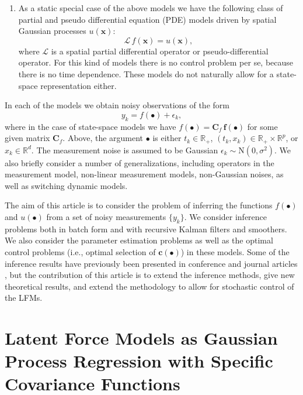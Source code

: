 \documentclass[journal]{IEEEtran}
\begin{document}
\begin{enumerate}
\item As a static special case of the above models we have the following class of partial and pseudo differential equation (PDE) models driven by spatial Gaussian processes $u(\mathbf{x})$:
%
\begin{equation}
  \mathcal{L} \, f(\mathbf{x}) = u(\mathbf{x}),
\end{equation}
%
where $\mathcal{L}$ is a spatial partial differential operator or pseudo-differential operator. For this kind of models there is no control problem per se, because there is no time dependence.  These models do not naturally allow for a state-space representation either.
\end{enumerate}

In each of the models we obtain noisy observations of the form
%
\begin{equation}
  y_k = f(\bullet) + \epsilon_k,
\end{equation}
%
where in the case of state-space models we have $f(\bullet) = \mathbf{C}_f \, \mathbf{f}(\bullet)$ for some given matrix $\mathbf{C}_f$. Above, the argument $\bullet$ is either $t_k \in \mathbb{R}_+$, $(t_k,x_k) \in \mathbb{R}_+ \times \mathbb{R}^p$, or $x_k \in \mathbb{R}^d$. The measurement noise is assumed to be Gaussian $\epsilon_k \sim \mathrm{N}(0,\sigma^2)$. We also briefly consider a number of generalizations, including operators in the measurement model, non-linear measurement models, non-Gaussian noises, as well as switching dynamic models.

The aim of this article is to consider the problem of inferring the functions $f(\bullet)$ and $u(\bullet)$ from a set of noisy measurements $\{ y_k \}$. We consider inference problems both in batch form and with recursive Kalman filters and smoothers. We also consider the parameter estimation problems as well as the optimal control problems (i.e., optimal selection of $\mathbf{c}(\bullet)$) in these models. Some of the inference results have previously been presented in conference and journal articles \cite{Alvarez+Luengo+Lawrence:2009,Alvarez:2010,Alvarez+Luengo+Lawrence:2013,Hartikainen+Sarkka:2011,Hartikainen+Seppanen+Sarkka:2012}, but the contribution of this article is to extend the inference methods, give new theoretical results, and extend the methodology to allow for stochastic control of the LFMs.

\section{Latent Force Models as Gaussian Process Regression with Specific Covariance Functions}
\end{document}
